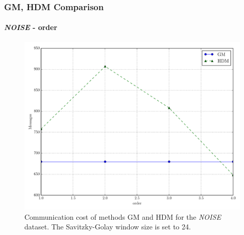 \documentclass[hyperref={pdfpagelabels=false}]{beamer}
\begin{document}
\begin{frame} \frametitle{GM, HDM Comparison}\framesubtitle{\emph{NOISE} - order}
\begin{figure}
\vspace{-0.5cm}
\centering
 \includegraphics[scale=0.3]{../img/main_msg_noisyinterweaving_order.pdf}
  \caption{Communication cost of methods GM and HDM for the \emph{NOISE} dataset. The Savitzky-Golay window size is set to 24.}
\end{figure}
 \end{frame}
\end{document}
